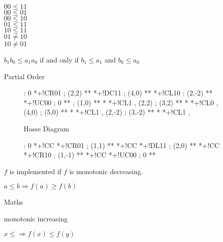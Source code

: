 \documentclass[a4paper,12pt]{article}
\begin{document}
$00 \leq 11$ \\
$00 \leq 01$ \\
$00 \leq 10$ \\
$01 \leq 11$ \\
$10 \leq 11$ \\
$01 \not= 10$ \\
$10 \not= 01$

$b_{1} b_{0} \leq a_{1} a_{0}$ if and only if $b_{1} \leq a_{1}$ and
$b_{0} \leq a_{0}$


Partial Order

\begin{figure}[ht]

\xy <1cm,0cm>:
0 *+!CR{01} ; (2,2) **\dir{-} *+!DC{11} ;
(4,0) **\dir{-} *+!CL{10} ;
(2,-2) **\dir{-} *+!UC{00} ;
0 **\dir{-} ;
(1,0) **\dir{-} *\dir{>} *+!CL{1} ,
(2,2) ; (3,2) **\dir{-} *\dir{>} *+!CL{0} ,
(4,0) ; (5,0) **\dir{-} *\dir{>} *+!CL{1} ,
(2,-2) ; (3,-2) **\dir{-} *\dir{>} *+!CL{1} ,
\endxy

\caption{Hasse Diagram}

\end{figure}

\begin{figure}[ht]

\xy <1cm,0cm>:
0 *+!CC{\bullet} *+!CR{01} ; (1,1) **\dir{-} *+!CC{\circ} *+!DL{11} ;
(2,0) **\dir{-} *+!CC{\bullet} *+!CR{10} ;
(1,-1) **\dir{-} *+!CC{\bullet} *+!UC{00} ;
0 **\dir{-}
\endxy

\caption{}

\end{figure}



$f$ is implemented if $f$ is monotonic decreasing.

$a \leq b \Rightarrow f(a) \geq f(b)$

Maths

monotonic increasing

$x \leq \Rightarrow f(x) \leq f(y)$



\end{document}
